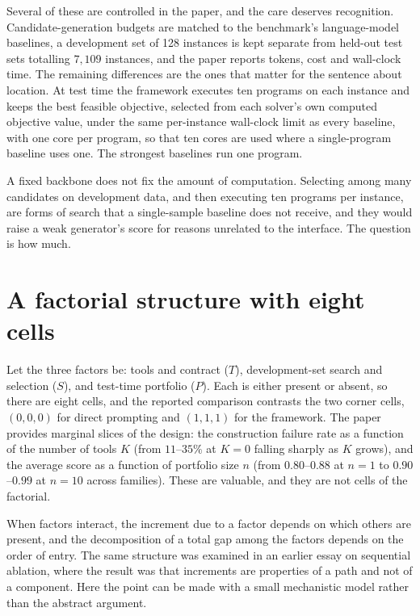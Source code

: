 \documentclass[11pt]{article}
\theoremstyle{definition}
\begin{document}
Several of these are controlled in the paper, and the care deserves recognition. Candidate-generation budgets are matched to the benchmark's language-model baselines, a development set of 128 instances is kept separate from held-out test sets totalling $7{,}109$ instances, and the paper reports tokens, cost and wall-clock time. The remaining differences are the ones that matter for the sentence about location. At test time the framework executes ten programs on each instance and keeps the best feasible objective, selected from each solver's own computed objective value, under the same per-instance wall-clock limit as every baseline, with one core per program, so that ten cores are used where a single-program baseline uses one. The strongest baselines run one program.

A fixed backbone does not fix the amount of computation. Selecting among many candidates on development data, and then executing ten programs per instance, are forms of search that a single-sample baseline does not receive, and they would raise a weak generator's score for reasons unrelated to the interface. The question is how much.

\section{A factorial structure with eight cells}

Let the three factors be: tools and contract ($T$), development-set search and selection ($S$), and test-time portfolio ($P$). Each is either present or absent, so there are eight cells, and the reported comparison contrasts the two corner cells, $(0,0,0)$ for direct prompting and $(1,1,1)$ for the framework. The paper provides marginal slices of the design: the construction failure rate as a function of the number of tools $K$ (from $11$--$35\%$ at $K=0$ falling sharply as $K$ grows), and the average score as a function of portfolio size $n$ (from $0.80$--$0.88$ at $n=1$ to $0.90$--$0.99$ at $n=10$ across families). These are valuable, and they are not cells of the factorial.

When factors interact, the increment due to a factor depends on which others are present, and the decomposition of a total gap among the factors depends on the order of entry. The same structure was examined in an earlier essay on sequential ablation, where the result was that increments are properties of a path and not of a component. Here the point can be made with a small mechanistic model rather than the abstract argument.
\end{document}
